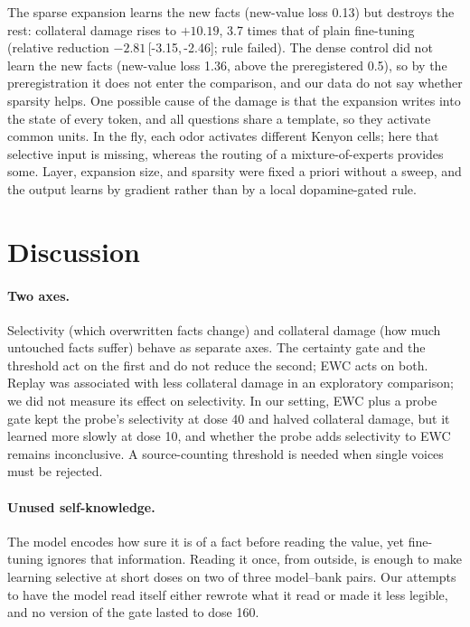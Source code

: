 \documentclass[11pt]{article}
\newcommand{\ci}[2]{\,[#1,\,#2]}
\begin{document}
The sparse expansion learns the new facts (new-value loss 0.13) but destroys the rest: collateral damage rises to $+10.19$, 3.7 times that of plain fine-tuning (relative reduction $-2.81$\ci{-3.15}{-2.46}; rule failed).
The dense control did not learn the new facts (new-value loss 1.36, above the preregistered 0.5), so by the preregistration it does not enter the comparison, and our data do not say whether sparsity helps.
One possible cause of the damage is that the expansion writes into the state of every token, and all questions share a template, so they activate common units.
In the fly, each odor activates different Kenyon cells; here that selective input is missing, whereas the routing of a mixture-of-experts provides some.
Layer, expansion size, and sparsity were fixed a priori without a sweep, and the output learns by gradient rather than by a local dopamine-gated rule.

\section{Discussion}

\paragraph{Two axes.}
Selectivity (which overwritten facts change) and collateral damage (how much untouched facts suffer) behave as separate axes.
The certainty gate and the threshold act on the first and do not reduce the second; EWC acts on both.
Replay was associated with less collateral damage in an exploratory comparison; we did not measure its effect on selectivity.
In our setting, EWC plus a probe gate kept the probe's selectivity at dose 40 and halved collateral damage, but it learned more slowly at dose 10, and whether the probe adds selectivity to EWC remains inconclusive.
A source-counting threshold is needed when single voices must be rejected.

\paragraph{Unused self-knowledge.}
The model encodes how sure it is of a fact before reading the value, yet fine-tuning ignores that information.
Reading it once, from outside, is enough to make learning selective at short doses on two of three model--bank pairs.
Our attempts to have the model read itself either rewrote what it read or made it less legible, and no version of the gate lasted to dose 160.
\end{document}
